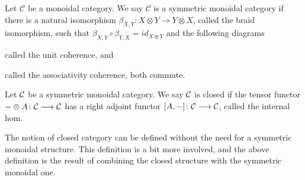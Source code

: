 \begin{definition}
Let $ \mathcal{C}$ be a monoidal category. We say  $ \mathcal{C}$ is a symmetric monoidal category if there is a natural isomorphism $ \beta_{X,Y}: X\otimes Y \rightarrow Y \otimes X$, called the braid isomorphism, such that $ \beta_{X,Y}\circ \beta_{Y,X} = id_{X\otimes Y} $ and the following diagrams 
\begin{center}
\end{center}
called the unit coherence, and
\begin{center}
\end{center}
called the associativity coherence, both commute. 
\end{definition}

\begin{definition}
Let $\mathcal{C}$ be a symmetric monoidal category. We say $\mathcal{C}$ is closed if the tensor functor $-\otimes A\colon \mathcal{C} \longrightarrow \mathcal{C}$ has a right adjoint functor $[A, -]\colon \mathcal{C} \longrightarrow \mathcal{C}$, called the internal hom. 
\end{definition}

The notion of closed category can be defined without the need for a symmetric monoidal structure. This definition is a bit more involved, and the above definition is the result of combining the closed structure with the symmetric monoidal one. 

